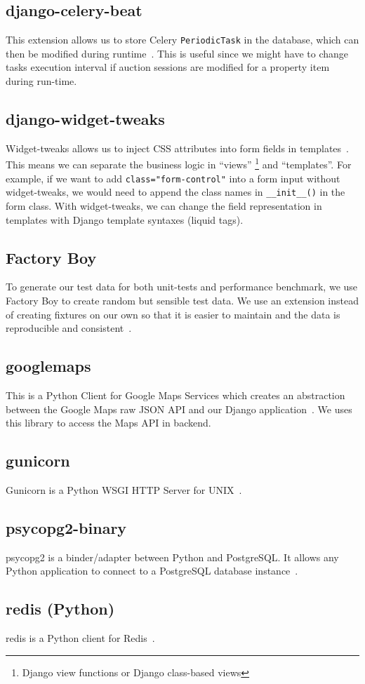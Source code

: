 \subsection{django-celery-beat}\label{sec:dep-celery-beat}
This extension allows us to store Celery \texttt{PeriodicTask} in the database,
which can then be modified during
runtime~\parencite{django-celery-beat-doc}. This is useful since we
might have to change tasks execution interval if auction sessions are modified
for a property item during run-time.

\subsection{django-widget-tweaks}
Widget-tweaks allows us to inject CSS attributes into form fields in
templates~\parencite{widget-tweaks}. This means we can separate the business logic
in ``views'' \footnote{Django view functions or Django class-based views} and
``templates''. For example, if we want to add \texttt{class="form-control"}
into a form input without widget-tweaks, we would need to append the class names
in \texttt{\_\_init\_\_()} in the form class. With widget-tweaks, we can change the
field representation in templates with Django template syntaxes (liquid tags).

\subsection{Factory Boy}
To generate our test data for both unit-tests and performance benchmark, we use
Factory Boy to create random but sensible test data. We use an extension
instead of creating fixtures on our own so that it is easier to maintain and the
data is reproducible and consistent~\parencite{factory-boy-doc}.

\subsection{googlemaps}
This is a Python Client for Google Maps Services which creates an abstraction
between the Google Maps raw JSON API and our Django
application~\parencite{python-google-maps}. We uses this library to access the Maps
API in backend.

\subsection{gunicorn}
Gunicorn is a Python WSGI HTTP Server for UNIX~\parencite{gunicorn}.

\subsection{psycopg2-binary}
psycopg2 is a binder/adapter between Python and PostgreSQL\@. It allows any Python
application to connect to a PostgreSQL database instance~\parencite{psycopg2}.

\subsection{redis (Python)}
redis is a Python client for Redis~\parencite{python-redis}.
